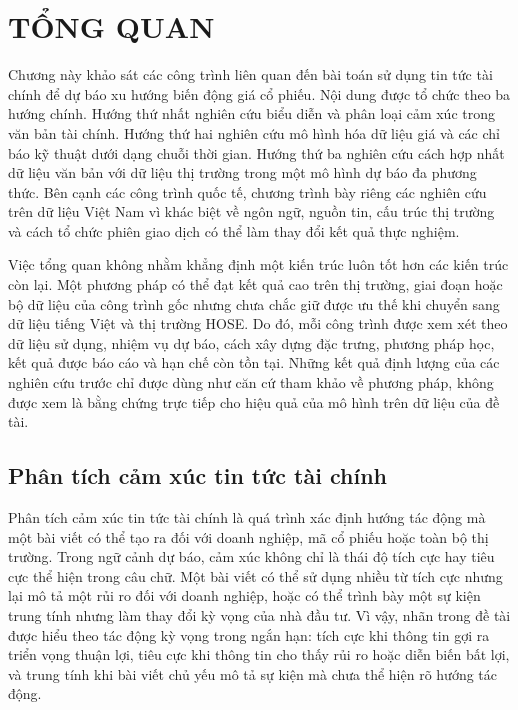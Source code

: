 \chapter{TỔNG QUAN}
\label{ch:tong-quan}

Chương này khảo sát các công trình liên quan đến bài toán sử dụng tin tức tài chính để
dự báo xu hướng biến động giá cổ phiếu. Nội dung được tổ chức theo ba hướng chính.
Hướng thứ nhất nghiên cứu biểu diễn và phân loại cảm xúc trong văn bản tài chính.
Hướng thứ hai nghiên cứu mô hình hóa dữ liệu giá và các chỉ báo kỹ thuật dưới dạng
chuỗi thời gian. Hướng thứ ba nghiên cứu cách hợp nhất dữ liệu văn bản với dữ liệu thị
trường trong một mô hình dự báo đa phương thức. Bên cạnh các công trình quốc tế, chương
trình bày riêng các nghiên cứu trên dữ liệu Việt Nam vì khác biệt về ngôn ngữ, nguồn tin,
cấu trúc thị trường và cách tổ chức phiên giao dịch có thể làm thay đổi kết quả thực
nghiệm.

Việc tổng quan không nhằm khẳng định một kiến trúc luôn tốt hơn các kiến trúc còn lại.
Một phương pháp có thể đạt kết quả cao trên thị trường, giai đoạn hoặc bộ dữ liệu của
công trình gốc nhưng chưa chắc giữ được ưu thế khi chuyển sang dữ liệu tiếng Việt và
thị trường HOSE. Do đó, mỗi công trình được xem xét theo dữ liệu sử dụng, nhiệm vụ dự
báo, cách xây dựng đặc trưng, phương pháp học, kết quả được báo cáo và hạn chế còn tồn
tại. Những kết quả định lượng của các nghiên cứu trước chỉ được dùng như căn cứ tham
khảo về phương pháp, không được xem là bằng chứng trực tiếp cho hiệu quả của mô hình
trên dữ liệu của đề tài.

\section{Phân tích cảm xúc tin tức tài chính}
\label{sec:tq-sentiment}

Phân tích cảm xúc tin tức tài chính là quá trình xác định hướng tác động mà một bài
viết có thể tạo ra đối với doanh nghiệp, mã cổ phiếu hoặc toàn bộ thị trường. Trong
ngữ cảnh dự báo, cảm xúc không chỉ là thái độ tích cực hay tiêu cực thể hiện trong câu
chữ. Một bài viết có thể sử dụng nhiều từ tích cực nhưng lại mô tả một rủi ro đối với
doanh nghiệp, hoặc có thể trình bày một sự kiện trung tính nhưng làm thay đổi kỳ vọng
của nhà đầu tư. Vì vậy, nhãn trong đề tài được hiểu theo tác động kỳ vọng trong ngắn
hạn: tích cực khi thông tin gợi ra triển vọng thuận lợi, tiêu cực khi thông tin cho thấy
rủi ro hoặc diễn biến bất lợi, và trung tính khi bài viết chủ yếu mô tả sự kiện mà chưa
thể hiện rõ hướng tác động.

